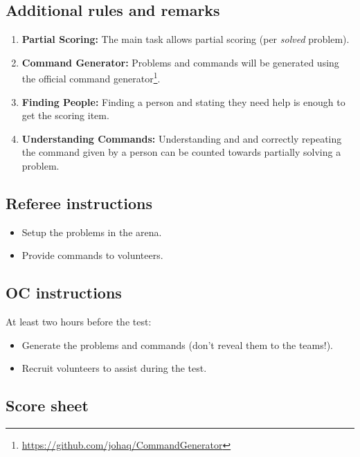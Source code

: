 \subsection*{Additional rules and remarks}
\begin{enumerate}[nosep]
	\item \textbf{Partial Scoring:} The main task allows partial scoring (per \emph{solved} problem).

	\item \textbf{Command Generator:} Problems and commands will be generated using the official command generator\footnote{\url{https://github.com/johaq/CommandGenerator}}.
	\item \textbf{Finding People:} Finding a person and stating they need help is enough to get the scoring item. 
	\item \textbf{Understanding Commands:} Understanding and and correctly repeating the command given by a person can be counted towards partially solving a problem.
\end{enumerate}

\subsection*{Referee instructions}
\begin{itemize}
	\item Setup the problems in the arena.
	\item Provide commands to volunteers.
\end{itemize}

\subsection*{OC instructions}

At least two hours before the test:
\begin{itemize}
	\item Generate the problems and commands (don't reveal them to the teams!).
	\item Recruit volunteers to assist during the test.
\end{itemize}


\subsection*{Score sheet}


